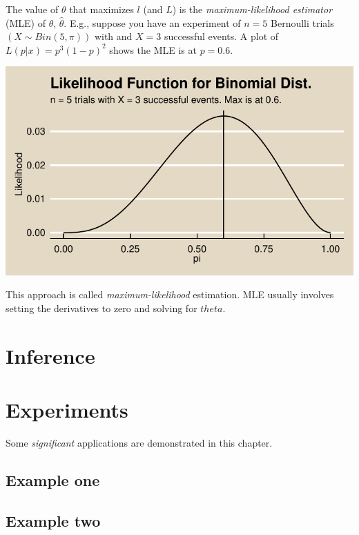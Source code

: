 \documentclass[
]{book}
\begin{document}
The value of \(\theta\) that maximizes \(l\) (and \(L\)) is the \emph{maximum-likelihood estimator} (MLE) of \(\theta\), \(\hat{\theta}\). E.g., suppose you have an experiment of \(n = 5\) Bernoulli trials \(\left(X \sim Bin(5, \pi) \right)\) with and \(X = 3\) successful events. A plot of \(L(p|x) = p^3(1 - p)^2\) shows the MLE is at \(p = 0.6\).

\includegraphics{data-sci_files/figure-latex/unnamed-chunk-31-1.pdf}

This approach is called \emph{maximum-likelihood} estimation. MLE usually involves setting the derivatives to zero and solving for \(theta\).

\hypertarget{inference}{%
\chapter{Inference}\label{inference}}

\hypertarget{experiments}{%
\chapter{Experiments}\label{experiments}}

Some \emph{significant} applications are demonstrated in this chapter.

\hypertarget{example-one}{%
\section{Example one}\label{example-one}}

\hypertarget{example-two}{%
\section{Example two}\label{example-two}}
\end{document}
